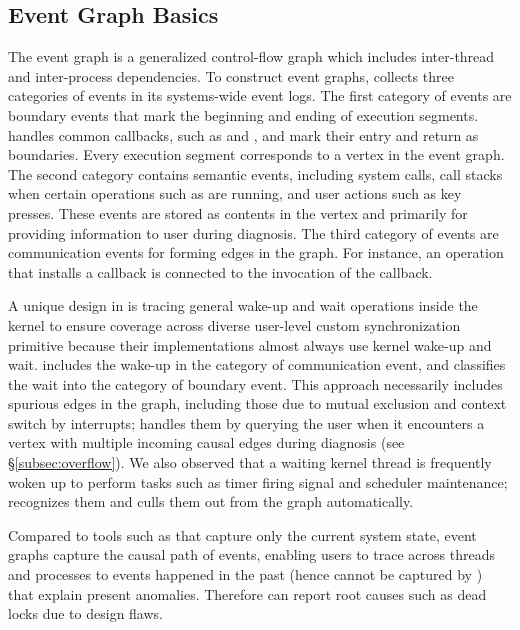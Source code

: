 \subsection{Event Graph Basics}\label{subsec:eventgraph}

The event graph is a generalized control-flow graph which includes inter-thread
and inter-process dependencies. To construct event graphs, \xxx collects three
categories of events in its systems-wide event logs. The first category of
events are boundary events that mark the beginning and ending of execution
segments. \xxx handles common callbacks, such as 
and , and mark their entry and return as boundaries.
Every execution segment corresponds to a vertex in the event graph. The second
category contains semantic events, including system calls, call stacks when
certain operations such as  are running, and user actions such as
key presses. These events are stored as contents in the vertex and primarily for
providing information to user during diagnosis. The third category of events are
communication events for forming edges in the graph. For instance, an operation
that installs a callback is connected to the invocation of the callback.


A unique design in \xxx is tracing general wake-up and wait operations inside
the kernel to ensure coverage across diverse user-level custom
synchronization primitive because their implementations almost always
use kernel wake-up and wait. \xxx includes the wake-up in the category of
communication event, and classifies the wait into the category of boundary
event. This approach necessarily includes spurious edges in the graph, including
those due to mutual exclusion and context switch by interrupts; \xxx handles
them by querying the user when it encounters a vertex with multiple incoming
causal edges during diagnosis (see \S\ref{subsec:overflow}). We also observed
that a waiting kernel thread is frequently woken up to perform tasks such as
timer firing signal and scheduler maintenance; \xxx recognizes them and culls
them out from the graph automatically.

Compared to tools such as \spindump that capture only the current system state,
event graphs capture the causal path of events, enabling users to trace across
threads and processes to events happened in the past (hence cannot be captured by
\spindump) that explain present anomalies. Therefore \xxx can report
root causes such as dead locks due to design flaws.

